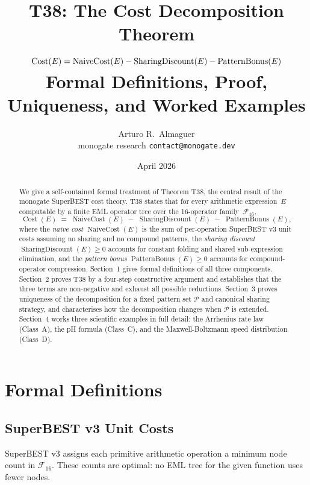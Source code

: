 \documentclass[12pt,a4paper]{article}
\title{T38: The Cost Decomposition Theorem\\[6pt]
       \large
       $\Cost(E) = \NC(E) - \SD(E) - \PB(E)$\\[4pt]
       Formal Definitions, Proof, Uniqueness, and Worked Examples}
\author{Arturo R.\ Almaguer\\
\small monogate research \quad \texttt{contact@monogate.dev}}
\date{April 2026}
\theoremstyle{definition}
\newcommand{\Cost}{\operatorname{Cost}}
\newcommand{\NC}{\operatorname{NaiveCost}}
\newcommand{\SD}{\operatorname{SharingDiscount}}
\newcommand{\PB}{\operatorname{PatternBonus}}
\begin{document}
\maketitle

\begin{abstract}
We give a self-contained formal treatment of Theorem T38, the central result
of the monogate SuperBEST cost theory.
T38 states that for every arithmetic expression~$E$ computable by a finite EML
operator tree over the 16-operator family~$\mathcal{F}_{16}$,
\[
  \Cost(E) \;=\; \NC(E) \;-\; \SD(E) \;-\; \PB(E),
\]
where the \emph{na\"{i}ve cost} $\NC(E)$ is the sum of per-operation SuperBEST
v3 unit costs assuming no sharing and no compound patterns, the
\emph{sharing discount} $\SD(E) \geq 0$ accounts for constant folding and
shared sub-expression elimination, and the \emph{pattern bonus} $\PB(E) \geq 0$
accounts for compound-operator compression.
Section~1 gives formal definitions of all three components.
Section~2 proves T38 by a four-step constructive argument and establishes that
the three terms are non-negative and exhaust all possible reductions.
Section~3 proves uniqueness of the decomposition for a fixed pattern set
$\mathcal{P}$ and canonical sharing strategy, and characterises how
the decomposition changes when $\mathcal{P}$ is extended.
Section~4 works three scientific examples in full detail: the Arrhenius rate
law (Class~A), the pH formula (Class~C), and the Maxwell-Boltzmann speed
distribution (Class~D).
\end{abstract}

\tableofcontents
\bigskip

\section{Formal Definitions}
\label{sec:defs}

\subsection{SuperBEST v3 Unit Costs}

SuperBEST v3 assigns each primitive arithmetic operation a minimum node count
in $\mathcal{F}_{16}$.  These counts are optimal: no EML tree for the given
function uses fewer nodes.
\end{document}
